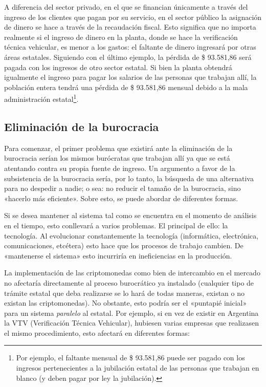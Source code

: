 \documentclass[12pt,a4paper,twoside]{book}
\begin{document}
A diferencia del sector privado, en el que se financian únicamente a través del ingreso de los clientes que pagan por su servicio, en el sector público la asignación de dinero se hace a través de la recaudación fiscal. Esto significa que no importa realmente si el ingreso de dinero en la planta, donde se hace la verificación técnica vehicular, es menor a los gastos: el faltante de dinero ingresará por otras áreas estatales. Siguiendo con el último ejemplo, la pérdida de \$ 93.581,86 será pagada con los ingresos de otro sector estatal. Si bien la planta obtendrá igualmente el ingreso para pagar los salarios de las personas que trabajan allí, la población entera tendrá una pérdida de \$ 93.581,86 mensual debido a la mala administración estatal\footnote{Por ejemplo, el faltante mensual de \$ 93.581,86 puede ser pagado con los ingresos pertenecientes a la jubilación estatal de las personas que trabajan en blanco (y deben pagar por ley la jubilación).}.

\subsection{Eliminación de la burocracia}
Para comenzar, el primer problema que existirá ante la eliminación de la burocracia serían los mismos burócratas que trabajan allí ya que se está atentando contra su propia fuente de ingreso. Un argumento a favor de la subsistencia de la burocracia sería, por lo tanto, la búsqueda de una alternativa para no despedir a nadie; o sea: no reducir el tamaño de la burocracia, sino «hacerlo más eficiente». Sobre esto, se puede abordar de diferentes formas.

Si se desea mantener al sistema tal como se encuentra en el momento de análisis en el tiempo, esto conllevará a varios problemas. El principal de ello: la tecnología. Al evolucionar constantemente la tecnología (informática, electrónica, comunicaciones, etcétera) esto hace que los procesos de trabajo cambien. De «mantenerse el sistema» esto incurriría en ineficiencias en la producción.

La implementación de las criptomonedas como bien de intercambio en el mercado no afectaría directamente al proceso burocrático ya instalado (cualquier tipo de trámite estatal que deba realizarse se lo hará de todas maneras, existan o no existan las criptomonedas). No obstante, esto podría ser el «puntapié inicial» para un sistema \textit{paralelo} al estatal. Por ejemplo, si en vez de existir en Argentina la VTV (Verificación Técnica Vehicular), hubiesen varias empresas que realizasen el mismo procedimiento, esto afectará en diferentes formas:
\end{document}
